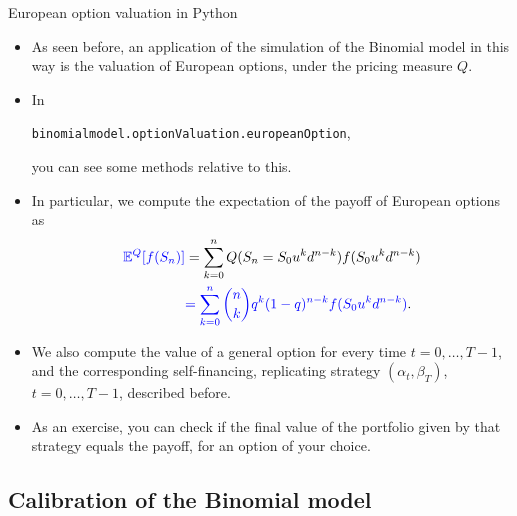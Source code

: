 \documentclass[9 pt]{beamer} %
\def \blue {\textcolor{blue}}
\def \bE {\mathbb{E}}
\begin{document}
\begin{frame}{European option valuation in Python}
\begin{itemize}
\item As seen before, an application of the simulation of the Binomial model in this way is the valuation of European options, under the pricing measure $Q$.
\item In  
\begin{center}
\texttt{binomialmodel.optionValuation.europeanOption},
\end{center}
you can see some methods relative to this.
\item In particular, we compute the expectation of the payoff of European options as
\begin{align}
\blue{\bE^Q[f(S_{n})]}&=\sum_{k=0}^n Q(S_{n}=S_0u^{k}d^{n-k}) f(S_0u^{k}d^{n-k}) \notag \\
&\blue{= \sum_{k=0}^n \binom{n}{k}q^k(1-q)^{n-k}f(S_0u^{k}d^{n-k})}.\notag
\end{align}
\item We also compute the value of a general option for every time $t=0,\dots,T-1$, and the corresponding self-financing, replicating strategy 
$(\alpha_t,\beta_T)$, $t=0,\dots,T-1$, described before.
\item As an exercise, you can check if the final value of the portfolio given by that strategy equals the payoff, for an option of your choice.
\end{itemize}
\end{frame}


\subsection{Calibration of the Binomial model}

\frame{  \tableofcontents[
    sectionstyle=show/shaded,
    subsectionstyle=show/shaded/shaded,
    subsubsectionstyle=show/shaded/shaded/shaded
    ]}
\end{document}
